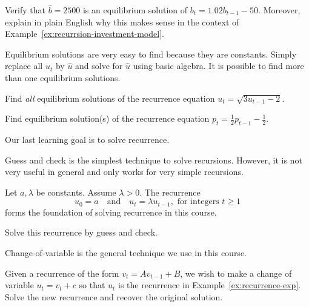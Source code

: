 \documentclass[../main.tex]{subfiles}
\begin{document}
\begin{example}
  Verify that \(\hat{b} = 2500\) is an equilibrium solution of \(b_{t} = 1.02 b_{t-1} - 50\).  Moreover, explain in plain English why this makes sense in the context of Example~\ref{ex:recurrsion-investment-model}.
\end{example}

\faStar{} Equilibrium solutions are very easy to find because they are constants. Simply replace all \(u_{t}\) by \(\hat{u}\) and solve for \(\hat{u}\) using basic algebra. It is possible to find more than one equilibrium solutions.

\begin{example}
  Find \emph{all} equilibrium solutions of the recurrence equation \(u_{t} = \sqrt{3 u_{t-1} - 2}\).
\end{example}
\clearpage

\begin{example}
  Find equilibrium solution(s) of the recurrence equation \(p_{t} = \frac{1}{2} p_{t-1} - \frac{1}{2}\).
\end{example}

Our last learning goal is to solve recurrence.

Guess and check is the simplest technique to solve recursions. However, it is not very useful in general and only works for very simple recursions.
\begin{example}[important] \label{ex:recurrence-exp}
  Let \(a,\lambda\) be constants. Assume \(\lambda > 0\). The recurrence 
  \[ 
    u_{0} = a \quad\text{and}\quad u_{t} = \lambda u_{t-1}, \text{ for integers } t \ge 1 
  \] 
  forms the foundation of solving recurrence in this course. 
  
  Solve this recurrence by guess and check.
\end{example}

\clearpage

Change-of-variable is the general technique we use in this course. 

\begin{method}
  Given a recurrence of the form \(v_{t} = A v_{t-1} + B\), we wish to make a change of variable \(u_{t} = v_{t} + c\) so that \(u_{t}\) is the recurrence in Example~\ref{ex:recurrence-exp}. Solve the new recurrence and recover the original solution.
\end{method}
\end{document}
